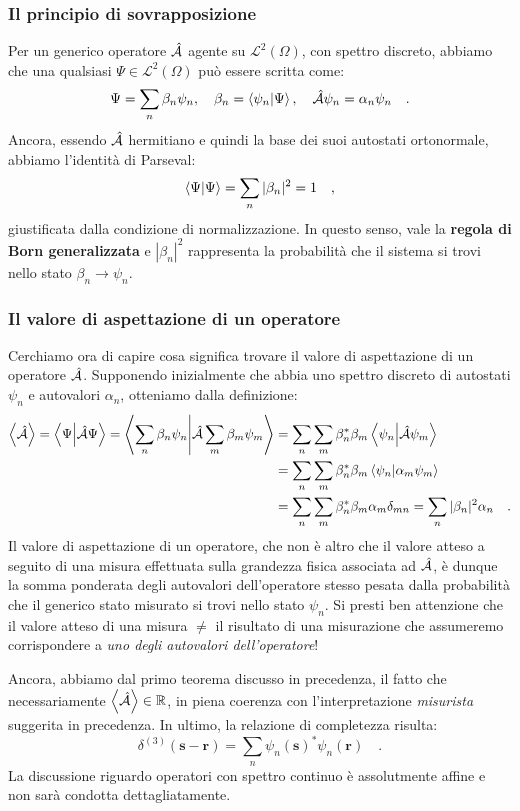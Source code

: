 \subsubsection{Il principio di sovrapposizione}
Per un generico operatore $\hat{\mathcal{A}}$ agente su $\mathcal{L}^2(\Omega)$, con spettro discreto, abbiamo che una qualsiasi $\Psi \in \mathcal{L}^2(\Omega)$ può essere scritta come:
\[
    \Psi = \sum_n \beta_n\psi_n, \quad \beta_n = \braket{\psi_n}{\Psi}, \quad  \hat{\mathcal{A}} \psi_n = \alpha_n \psi_n \quad.
\]
Ancora, essendo $\hat{\mathcal{A}}$ hermitiano e quindi la base dei suoi autostati ortonormale, abbiamo l'identità di Parseval:
\[
    \braket{\Psi}{\Psi} = \sum_n |\beta_n|^2 = 1 \quad,
\]
giustificata dalla condizione di normalizzazione. In questo senso, vale la \textbf{regola di Born generalizzata} e $|\beta_n|^2$ rappresenta la probabilità che il sistema si trovi nello stato $\beta_n \to \psi_n$.

\subsubsection{Il valore di aspettazione di un operatore}
Cerchiamo ora di capire cosa significa trovare il valore di aspettazione di un operatore $\hat{\mathcal{A}}$. Supponendo inizialmente che abbia uno spettro discreto di autostati $\psi_n$ e autovalori $\alpha_n$, otteniamo dalla definizione:
\[
\begin{aligned}
    \left\langle \hat{\mathcal{A}} \right\rangle = \braket{\Psi}{\hat{\mathcal{A}}\Psi} = \braket{\sum_n \beta_n\psi_n}{\hat{\mathcal{A}}\sum_m \beta_m\psi_m} &= \sum_n \sum_m \beta_n^* \beta_m \braket{\psi_n}{\hat{\mathcal{A}}\psi_m} \\
    &= \sum_n \sum_m \beta_n^* \beta_m \braket{\psi_n}{\alpha_m\psi_m}\\
    &= \sum_n \sum_m \beta_n^* \beta_m \alpha_m \delta_{mn} = \sum_n |\beta_n|^2 \alpha_n \quad.
\end{aligned}
\]
Il valore di aspettazione di un operatore, che non è altro che il valore atteso a seguito di una misura effettuata sulla grandezza fisica associata ad $\hat{\mathcal{A}}$, è dunque la somma ponderata degli autovalori dell'operatore stesso pesata dalla probabilità che il generico stato misurato si trovi nello stato $\psi_n$. Si presti ben attenzione che il valore atteso di una misura $\neq$ il risultato di una misurazione che assumeremo corrispondere a \emph{uno degli autovalori dell'operatore}!

Ancora, abbiamo dal primo teorema discusso in precedenza, il fatto che necessariamente $\left\langle \hat{\mathcal{A}} \right\rangle \in \mathbb{R}$, in piena coerenza con l'interpretazione \emph{misurista} suggerita in precedenza. In ultimo, la relazione di completezza risulta:
\[
    \delta^{(3)}(\bm{s}-\bm{r}) = \sum_n \psi_n(\bm{s})^*\psi_n(\bm{r}) \quad.
\]
La discussione riguardo operatori con spettro continuo è assolutmente affine e non sarà condotta dettagliatamente.

